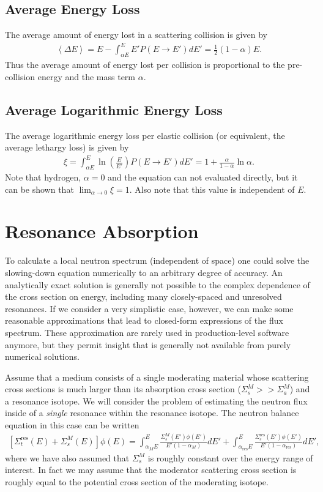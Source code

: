 \documentclass[11pt]{article}
\begin{document}
\subsection{Average Energy Loss}
\label{sec:orgheadline7}
The average amount of energy lost in a scattering collision is given by
\begin{align}
  \left< \Delta E \right> = E - \int_{\alpha E}^E E' P(E \rightarrow E') dE' = \frac{1}{2}(1-\alpha)E.
\end{align}
Thus the average amount of energy lost per collision is proportional to the pre-collision energy and the mass term \(\alpha\).

\subsection{Average Logarithmic Energy Loss}
\label{sec:orgheadline8}
The average logarithmic energy loss per elastic collision (or equivalent, the average lethargy loss) is given by
\begin{align}
  \xi = \int_{\alpha E}^E \ln\left(\frac{E}{E'}\right) P(E \rightarrow E') dE' = 1 + \frac{\alpha}{1-\alpha} \ln\alpha.
\end{align}
Note that hydrogen, \(\alpha = 0\) and the equation can not evaluated directly, but it can be shown that \(\lim_{\alpha \rightarrow 0} \xi = 1\).  Also note that this value is independent of \(E\).

\section{Resonance Absorption}
\label{sec:orgheadline13}
To calculate a local neutron spectrum (independent of space) one could solve the slowing-down equation numerically to an arbitrary degree of accuracy.  An analytically exact solution is generally not possible to the complex dependence of the cross section on energy, including many closely-spaced and unresolved resonances.  If we consider a very simplistic case, however, we can make some reasonable approximations that lead to closed-form expressions of the flux spectrum.  These approximation are rarely used in production-level software anymore, but they permit insight that is generally not available from purely numerical solutions.  

Assume that a medium consists of a single moderating material whose scattering cross sections is much larger than its absorption cross section (\(\Sigma_s^M >> \Sigma_a^M\)) and a resonance isotope.  We will consider the problem of estimating the neutron flux inside of a \emph{single} resonance within the resonance isotope.  The neutron balance equation in this case can be written
\begin{align}
  \left[ \Sigma_t^\text{res}(E) + \Sigma_s^M(E) \right] \phi(E)
  = \int_{\alpha_M E}^E \frac{\Sigma_s^M(E') \phi(E')}{E'(1-\alpha_M)} dE'
  + \int_{\alpha_\text{res} E}^E \frac{\Sigma_s^\text{res}(E') \phi(E')}{E'(1-\alpha_\text{res})} dE',
\end{align}
where we have also assumed that \(\Sigma_s^M\) is roughly constant over the energy range of interest.  In fact we may assume that the moderator scattering cross section is roughly equal to the potential cross section of the moderating isotope.
\end{document}
